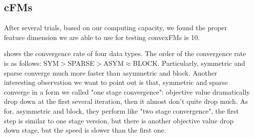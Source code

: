 \documentclass{article}
\begin{document}
\subsection{cFMs} \label{sec:result_cfm}

After several trials, based on our computing capacity, we found the proper feature dimension we are able to use for testing convexFMs is 10.

 shows the convergence rate of four data types. The order of the convergence rate is as follows: SYM$>$SPARSE$>$ASYM$\approx$BLOCK. Particularly, symmetric and sparse converge much more faster than asymmetric and block. Another interesting observation we want to point out is that, symmetric and sparse converge in a form we called "one stage convergence": objective value dramatically drop down at the first several iteration, then it almost don't quite drop much. As for, asymmetric and block, they perform like "two stage convergence", the first step is similar to one stage version, but there is another objective value drop down stage, but the speed is slower than the first one.
\end{document}
